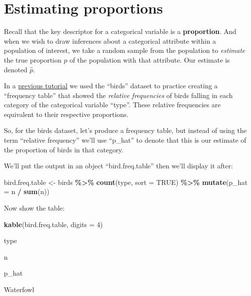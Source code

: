 \documentclass[
]{book}
\newenvironment{Shaded}{\begin{snugshade}}{\end{snugshade}}
\newcommand{\AttributeTok}[1]{\textcolor[rgb]{0.13,0.29,0.53}{#1}}
\newcommand{\ConstantTok}[1]{\textcolor[rgb]{0.56,0.35,0.01}{#1}}
\newcommand{\DecValTok}[1]{\textcolor[rgb]{0.00,0.00,0.81}{#1}}
\newcommand{\FunctionTok}[1]{\textcolor[rgb]{0.13,0.29,0.53}{\textbf{#1}}}
\newcommand{\NormalTok}[1]{#1}
\newcommand{\OtherTok}[1]{\textcolor[rgb]{0.56,0.35,0.01}{#1}}
\newcommand{\SpecialCharTok}[1]{\textcolor[rgb]{0.81,0.36,0.00}{\textbf{#1}}}
\begin{document}
\section{Estimating proportions}\label{estproportions}

Recall that the key descriptor for a categorical variable is a \textbf{proportion}. And when we wish to draw inferences about a categorical attribute within a population of interest, we take a random sample from the population to \emph{estimate} the true proportion \({p}\) of the population with that attribute. Our estimate is denoted \(\hat{p}\).

In a \hyperref[vis_cat_freq_table]{previous tutorial} we used the ``birds'' dataset to practice creating a ``frequency table'' that showed the \emph{relative frequencies} of birds falling in each category of the categorical variable ``type''. These relative frequencies are equivalent to their respective proportions.

So, for the birds dataset, let's produce a frequency table, but instead of using the term ``relative frequency'' we'll use ``p\_hat'' to denote that this is our estimate of the proportion of birds in that category.

We'll put the output in an object ``bird.freq.table'' then we'll display it after:

\begin{Shaded}
\begin{Highlighting}[]
\NormalTok{bird.freq.table }\OtherTok{\textless{}{-}}\NormalTok{ birds }\SpecialCharTok{\%\textgreater{}\%}
  \FunctionTok{count}\NormalTok{(type, }\AttributeTok{sort =} \ConstantTok{TRUE}\NormalTok{) }\SpecialCharTok{\%\textgreater{}\%} 
  \FunctionTok{mutate}\NormalTok{(}\AttributeTok{p\_hat =}\NormalTok{ n }\SpecialCharTok{/} \FunctionTok{sum}\NormalTok{(n))}
\end{Highlighting}
\end{Shaded}

Now show the table:

\begin{Shaded}
\begin{Highlighting}[]
\FunctionTok{kable}\NormalTok{(bird.freq.table, }\AttributeTok{digits =} \DecValTok{4}\NormalTok{)}
\end{Highlighting}
\end{Shaded}

type

n

p\_hat

Waterfowl
\end{document}
